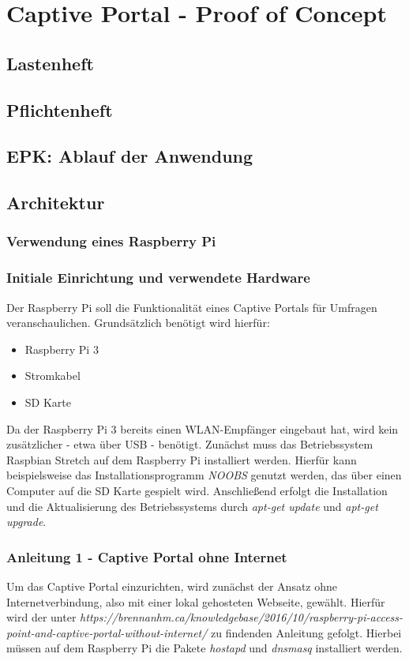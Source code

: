 \section{Captive Portal - Proof of Concept}
\label{section:realisation:captive_portal}
\subsection{Lastenheft}

\subsection{Pflichtenheft}

\subsection{EPK: Ablauf der Anwendung}

\subsection{Architektur}
\subsubsection{Verwendung eines Raspberry Pi}
\subsubsection*{Initiale Einrichtung und verwendete Hardware}
Der Raspberry Pi soll die Funktionalität eines Captive Portals für Umfragen veranschaulichen. Grundsätzlich benötigt wird hierfür:
\begin{itemize}
\item Raspberry Pi 3
\item Stromkabel
\item SD Karte
\end{itemize}

Da der Raspberry Pi 3 bereits einen WLAN-Empfänger eingebaut hat, wird kein zusätzlicher - etwa über USB - benötigt. Zunächst muss das Betriebssystem Raspbian Stretch auf dem Raspberry Pi  installiert werden. Hierfür kann beispielsweise das Installationsprogramm \textit{NOOBS} genutzt werden, das über einen Computer auf die SD Karte gespielt wird. Anschließend erfolgt die Installation und die Aktualisierung des Betriebssystems durch \textit{apt-get update} und \textit{apt-get upgrade}.

\subsubsection*{Anleitung 1 - Captive Portal ohne Internet}
Um das Captive Portal einzurichten, wird zunächst der Ansatz ohne Internetverbindung, also mit einer lokal gehosteten Webseite, gewählt. Hierfür wird der unter \textit{https://brennanhm.ca/knowledgebase/2016/10/raspberry-pi-access-point-and-captive-portal-without-internet/} zu findenden Anleitung gefolgt. Hierbei müssen auf dem Raspberry Pi die Pakete \textit{hostapd} und \textit{dnsmasq} installiert werden.

